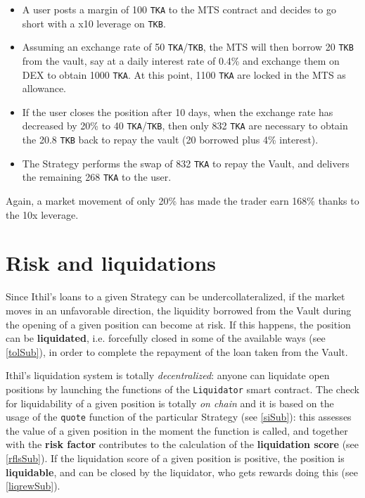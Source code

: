 \documentclass[a4paper,10 pt]{article}
\theoremstyle{definition}
\begin{document}
\begin{itemize}
\item A user posts a margin of 100 \verb|TKA| to the MTS contract and decides to go short with a x10 leverage on \verb|TKB|.
\item Assuming an exchange rate of 50 \verb|TKA|/\verb|TKB|, the MTS will then borrow 20 \verb|TKB| from the vault, say at a daily interest rate of 0.4\% and exchange them on DEX to obtain 1000 \verb|TKA|. At this point, 1100 \verb|TKA| are locked in the MTS as allowance.
\item If the user closes the position after 10 days, when the exchange rate has decreased by 20\% to 40 \verb|TKA|/\verb|TKB|, then only 832 \verb|TKA| are necessary to obtain the 20.8 \verb|TKB| back to repay the vault (20 borrowed plus 4\% interest).
\item The Strategy performs the swap of 832 \verb|TKA| to repay the Vault, and delivers the remaining 268 \verb|TKA| to the user. 
\end{itemize}
Again, a market movement of only 20\% has made the trader earn 168\% thanks to the 10x leverage.

\section{Risk and liquidations}\label{liqSec}
Since Ithil's loans to a given Strategy can be undercollateralized, if the market moves in an unfavorable direction, the liquidity borrowed from the Vault during the opening of a given position can become at risk. If this happens, the position can be {\bf liquidated}, i.e. forcefully closed in some of the available ways (see \ref{tolSub}), in order to complete the repayment of the loan taken from the Vault.

Ithil's liquidation system is totally {\it decentralized}: anyone can liquidate open positions by launching the functions of the \verb|Liquidator| smart contract. The check for liquidability of a given position is totally {\it on chain} and it is based on the usage of the \verb|quote| function of the particular Strategy (see \ref{siSub}): this assesses the value of a given position in the moment the function is called, and together with the {\bf risk factor} contributes to the calculation of the {\bf liquidation score} (see \ref{rflsSub}). If the liquidation score of a given position is positive, the position is {\bf liquidable}, and can be closed by the liquidator, who gets rewards doing this (see \ref{liqrewSub}).
\end{document}

